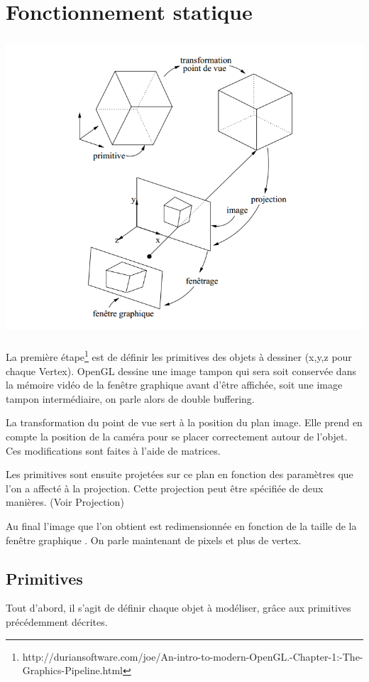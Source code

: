\section{Fonctionnement statique}
\begin{center}
	 \includegraphics[height=11cm]{img/Fonctionnement}
 \end{center}

La première étape\footnote{http://duriansoftware.com/joe/An-intro-to-modern-OpenGL.-Chapter-1:-The-Graphics-Pipeline.html} est de définir les primitives des objets à dessiner (x,y,z pour chaque Vertex).
OpenGL dessine une image tampon qui sera soit conservée dans la mémoire vidéo de la fenêtre graphique avant d’être affichée, soit une image tampon intermédiaire, on parle alors de double buffering.

La transformation du point de vue sert à la position du plan image. Elle prend en compte la position de la caméra pour se placer correctement autour de l'objet. Ces modifications sont faites à l'aide de matrices. 

Les primitives sont ensuite projetées sur ce plan en fonction des paramètres que l’on a affecté à la projection. Cette projection peut être spécifiée de deux manières. (Voir Projection)

Au final l’image que l’on obtient est redimensionnée en fonction de la taille de la fenêtre graphique . On parle maintenant de pixels et plus de vertex.
\newpage

\subsection{Primitives}
Tout d'abord, il s'agit de définir chaque objet à modéliser, grâce aux primitives précédemment décrites.

